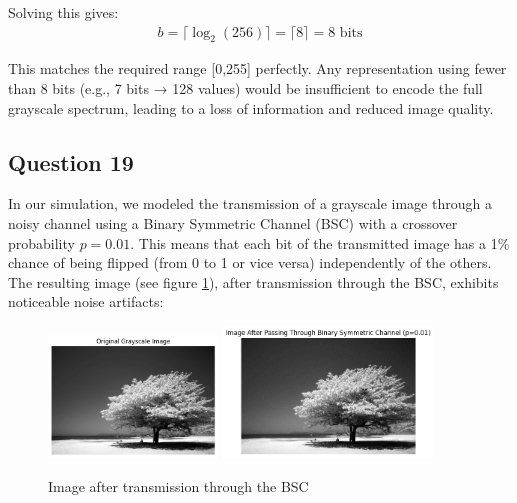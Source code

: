\documentclass[]{template}
\begin{document}
    \noindent
    Solving this gives:
    \begin{align*}
        b = \lceil \log_2(256) \rceil = \lceil 8 \rceil = 8 \text{ bits}
    \end{align*}

    \noindent
    This matches the required range [0,255] perfectly. 
    Any representation using fewer than 8 bits (e.g., 7 bits → 128 values) 
    would be insufficient to encode the full grayscale spectrum, leading to 
    a loss of information and reduced image quality.

    \subsection{Question 19}

    In our simulation, we modeled the transmission of a grayscale image through a noisy channel 
    using a Binary Symmetric Channel (BSC) with a crossover probability $p=0.01$. 
    This means that each bit of the transmitted image has a 1\% chance of being flipped 
    (from 0 to 1 or vice versa) independently of the others.\\

    \noindent
    The resulting image (see figure \ref{fig:image_bsc}), after transmission through the BSC, exhibits noticeable noise artifacts:
    \begin{figure}[ht]
        \centering
        \includegraphics[width=0.4\textwidth]{Images/image.png}
        \includegraphics[width=0.5\textwidth]{Images/image_bsc.png} 
        \caption{Image after transmission through the BSC}\label{fig:image_bsc}
    \end{figure}
\end{document}
